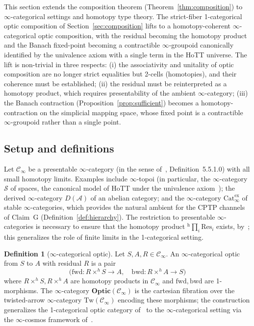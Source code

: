 \documentclass[11pt,a4paper]{article}
\theoremstyle{plain}
\theoremstyle{definition}
\newtheorem{definition}[theorem]{Definition}
\theoremstyle{remark}
\newcommand{\Optic}{\mathbf{Optic}}
\begin{document}
This section extends the composition theorem
(Theorem~\ref{thm:composition})
to $\infty$-categorical settings and homotopy type theory. The
strict-fiber 1-categorical optic composition of
Section~\ref{sec:composition} lifts to a homotopy-coherent
$\infty$-categorical optic composition, with the residual becoming the
homotopy product and the Banach fixed-point becoming a contractible
$\infty$-groupoid canonically identified by the univalence axiom with a
single term in the HoTT universe. The lift is non-trivial in three
respects: (i) the associativity and unitality of optic composition are
no longer strict equalities but 2-cells (homotopies), and their
coherence must be established; (ii) the residual must be reinterpreted
as a homotopy product, which requires presentability of the ambient
$\infty$-category; (iii) the Banach contraction
(Proposition~\ref{prop:sufficient}) becomes a homotopy-contraction on
the simplicial mapping space, whose fixed point is a contractible
$\infty$-groupoid rather than a single point.

\subsection{Setup and definitions}

Let $\mathcal{C}_\infty$ be a presentable $\infty$-category (in the
sense of~\cite{lurie2009htt}, Definition~5.5.1.0) with all small
homotopy limits. Examples include $\infty$-topoi (in particular, the
$\infty$-category $\mathcal{S}$ of spaces, the canonical model of HoTT
under the univalence axiom~\cite{hottbook2013}); the derived
$\infty$-category $D(\mathcal{A})$ of an abelian category; and the
$\infty$-category $\mathrm{Cat}^{\mathrm{ex}}_\infty$ of stable
$\infty$-categories, which provides the natural ambient for the CPTP
channels of Claim~G (Definition~\ref{def:hierarchy}). The restriction to
presentable $\infty$-categories is necessary to ensure that the
homotopy product ${}^{\mathrm{h}}\!\prod_i \mathrm{Res}_i$ exists, by~\cite[Proposition
5.5.3.1]{lurie2009htt}; this generalizes the role of finite limits in
the 1-categorical setting.

\begin{definition}[$\infty$-categorical optic]
\label{def:hott-optic}
Let $S, A, R \in \mathcal{C}_\infty$. An $\infty$-categorical optic
from $S$ to $A$ with residual $R$ is a pair
\[
\bigl(\mathrm{fwd}: R \times^h S \to A, \quad
      \mathrm{bwd}: R \times^h A \to S\bigr)
\]
where $R \times^h S, R \times^h A$ are homotopy products in
$\mathcal{C}_\infty$ and $\mathrm{fwd}, \mathrm{bwd}$ are 1-morphisms.
The $\infty$-category $\Optic(\mathcal{C}_\infty)$ is the cartesian
fibration over the twisted-arrow $\infty$-category
$\mathrm{Tw}(\mathcal{C}_\infty)$ encoding these morphisms; the
construction generalizes the 1-categorical optic category
of~\cite{riley2018optics} to the $\infty$-categorical setting via the
$\infty$-cosmos framework of~\cite{riehlverity2022}.
\end{definition}
\end{document}
